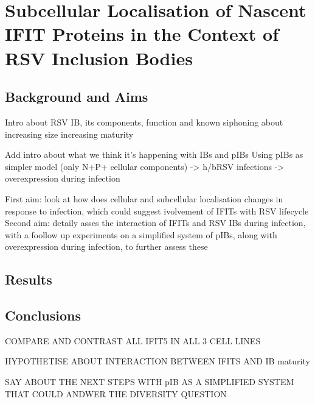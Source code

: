 \chapter{Subcellular Localisation of Nascent IFIT Proteins in the Context of RSV Inclusion Bodies} \label{ch:Subcellular Localisation of Nascent IFIT Proteins in the Context of RSV Inclusion Bodies}
\section{Background and Aims} \label{sec:Background and Aims-Chapter3}
Intro about RSV IB, its components, function and known siphoning about increasing size increasing maturity


Add intro about what we think it's happening with IBs and pIBs
Using pIBs as simpler model (only N+P+ cellular components) -> h/bRSV infections -> overexpression during infection

First aim: look at how does cellular and subcellular localisation changes in response to infection, which could suggest ivolvement of IFITs with RSV lifecycle
Second aim: detaily asses the interaction of IFITs and RSV IBs during infection, with a foollow up experiments on a simplified system of pIBs, along with overexpression during infection, to further assess these



\section{Results} \label{sec:Results-Chapter3}



\section{Conclusions} \label{sec:Conclusions-Chapter3}
COMPARE AND CONTRAST ALL IFIT5 IN ALL 3 CELL LINES

HYPOTHETISE ABOUT INTERACTION BETWEEN IFITS AND IB maturity

SAY ABOUT THE NEXT STEPS WITH pIB AS A SIMPLIFIED SYSTEM THAT COULD ANDWER THE DIVERSITY QUESTION


